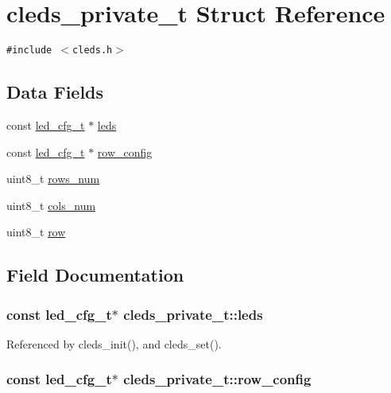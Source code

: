 \hypertarget{structcleds__private__t}{
\section{cleds\_\-private\_\-t Struct Reference}
\label{structcleds__private__t}
}
{\tt \#include $<$cleds.h$>$}

\subsection*{Data Fields}
\begin{CompactItemize}
\item 
const \hyperlink{led_8h_938ecc42017938534e3132bb674b0b23}{led\_\-cfg\_\-t} $\ast$ \hyperlink{structcleds__private__t_67b579305f4d8b14621e07b75f9f6e73}{leds}
\item 
const \hyperlink{led_8h_938ecc42017938534e3132bb674b0b23}{led\_\-cfg\_\-t} $\ast$ \hyperlink{structcleds__private__t_2fc66ba8d32530449e167fc46c3a258b}{row\_\-config}
\item 
uint8\_\-t \hyperlink{structcleds__private__t_bfe43e6502ca632e188110cdc24e6a33}{rows\_\-num}
\item 
uint8\_\-t \hyperlink{structcleds__private__t_18e08b5ce87a72396d14bed8ac3d0935}{cols\_\-num}
\item 
uint8\_\-t \hyperlink{structcleds__private__t_6317f0ab1470dd13501cf2f3a6a72499}{row}
\end{CompactItemize}


\subsection{Field Documentation}
\hypertarget{structcleds__private__t_67b579305f4d8b14621e07b75f9f6e73}{
\subsubsection{\setlength{\rightskip}{0pt plus 5cm}const {\bf led\_\-cfg\_\-t}$\ast$ {\bf cleds\_\-private\_\-t::leds}}}
\label{structcleds__private__t_67b579305f4d8b14621e07b75f9f6e73}




Referenced by cleds\_\-init(), and cleds\_\-set().\hypertarget{structcleds__private__t_2fc66ba8d32530449e167fc46c3a258b}{
\subsubsection{\setlength{\rightskip}{0pt plus 5cm}const {\bf led\_\-cfg\_\-t}$\ast$ {\bf cleds\_\-private\_\-t::row\_\-config}}}
\label{structcleds__private__t_2fc66ba8d32530449e167fc46c3a258b}




